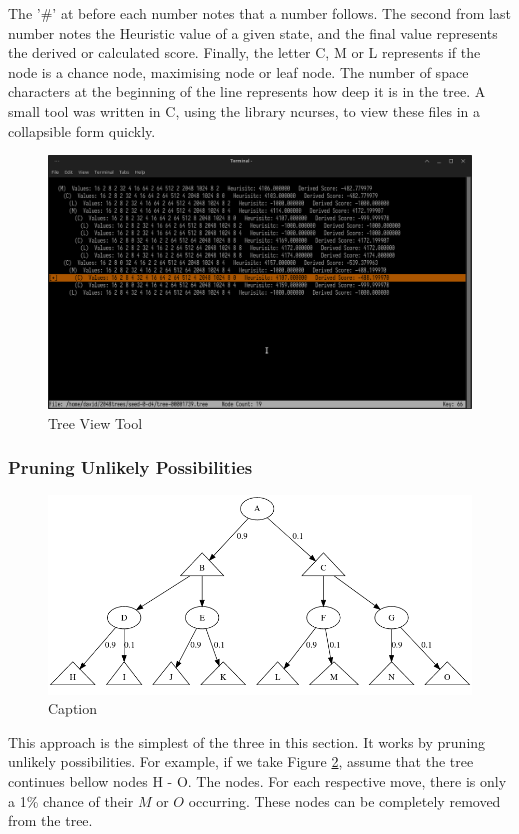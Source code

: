 \documentclass{article}
\begin{document}
The '\#' at before each number notes that a number follows. The second from last number notes the Heuristic value of a given state, and the final value represents the derived or calculated score. Finally, the letter C, M or L represents if the node is a chance node, maximising node or leaf node. The number of space characters at the beginning of the line represents how deep it is in the tree. A small tool was written in C, using the library ncurses, to view these files in a collapsible form quickly.
\begin{figure}
    \centering
    \includegraphics[width=1\textwidth]{Screenshot_2023-03-22_03-21-57.png}
    \caption{Tree View Tool}
    \label{fig:my_label}
\end{figure}
\subsubsection{Pruning Unlikely Possibilities}
\begin{figure}
    \centering
    \includegraphics[width=1\textwidth]{unlikleypruning.png}
    \caption{Caption}
    \label{fig:unlikley}
\end{figure}
This approach is the simplest of the three in this section. It works by pruning unlikely possibilities. For example, if we take Figure \ref{fig:unlikley}, assume that the tree continues bellow nodes H - O. The nodes. For each respective move, there is only a 1\% chance of their $M$ or $O$ occurring. These nodes can be completely removed from the tree.
\end{document}
